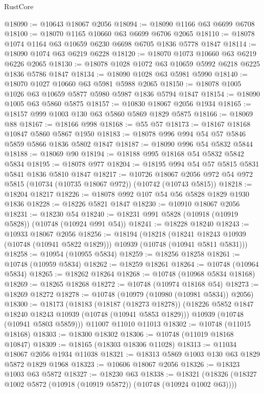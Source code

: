 \begin{lexlean}{RustCore}
\begin{coremodule}
@18090 := @10643 @18067 @2056
@18094 := @18090 @1166 @63 @6699 @6708
@18100 := @18070 @1165 @10660 @63 @6699 @6706 @2065
@18110 := @18078 @1074 @1164 @63 @10659 @6230 @6698 @6705 @1836 @5778 @1847
@18114 := @18090 @1074 @63 @6219 @6228
@18120 := @18070 @1073 @10660 @63 @6219 @6226 @2065
@18130 := @18078 @1028 @1072 @63 @10659 @5992 @6218 @6225 @1836 @5786 @1847
@18134 := @18090 @1028 @63 @5981 @5990
@18140 := @18070 @1027 @10660 @63 @5981 @5988 @2065
@18150 := @18078 @1005 @1026 @63 @10659 @5877 @5980 @5987 @1836 @5794 @1847
@18154 := @18090 @1005 @63 @5860 @5875
@18157 := @10830 @18067 @2056 @1934
@18165 := @18157 @999 @1003 @130 @63 @5860 @5869 @1829 @5875
@18166 := @18069 @88
@18167 := @18166 @998
@18168 := @55 @57
@18173 := @18167 @18168 @10847 @5860 @5867 @1950
@18183 := @18078 @996 @994 @54 @57 @5846 @5859 @5866 @1836 @5802 @1847
@18187 := @18090 @996 @54 @5832 @5844
@18188 := @18069 @90
@18194 := @18188 @995 @18168 @54 @5832 @5842 @5834
@18195 := @18078 @977
@18204 := @18195 @994 @54 @57 @5815 @5831 @5841 @1836 @5810 @1847
@18217 := @10726
    @18067
    @2056
    @972
    @54
    @972
    @5815
    (@10734 (@10735 @18067 @972))
    (@10742 (@10743 @5815))
@18218 := @18204 @18217
@18226 := @18078 @992 @107 @54 @56 @5828 @1829 @1930 @1836
@18228 := @18226 @5821 @1847
@18230 := @10910 @18067 @2056
@18231 := @18230 @54
@18240 := @18231 @991 @5828 (@10918 (@10919 @5828)) (@10748 (@10924 @991 @54))
@18241 := @18228 @18240
@18243 := @10933 @18067 @2056
@18256 := @18194
    (@18218
      (@18241 @18243 @10939 (@10748 (@10941 @5822 @1829)))
      @10939
      (@10748 (@10941 @5811 @5831)))
@18258 := @10954 (@10955 @5834)
@18259 := @18256 @18258
@18261 := @10748 (@10959 @5834)
@18262 := @18259 @18261
@18264 := @10748 (@10964 @5834)
@18265 := @18262 @18264
@18268 := @10748 (@10968 @5834 @18168)
@18269 := @18265 @18268
@18272 := @10748 (@10974 @18168 @54)
@18273 := @18269 @18272
@18278 := @10748 (@10979 (@10980 (@10981 @5834)) @2056)
@18300 := @18173
    (@18183
      (@18187 (@18273 @18278))
      (@18226 @5852 @1847 @18240 @18243 @10939 (@10748 (@10941 @5853 @1829)))
      @10939
      (@10748 (@10941 @5803 @5859)))
    @11007
    @11010
    @11013
@18302 := @10748 (@11015 @18168)
@18303 := @18300 @18302
@18306 := @10748 (@11019 @18168 @10847)
@18309 := @18165 (@18303 @18306 @11028)
@18313 := @11034 @18067 @2056 @1934 @11038
@18321 := @18313 @5869 @1003 @130 @63 @1829 @5872 @1829 @1968
@18323 := @10606 @18067 @2056
@18326 := @18323 @1003 @63 @5872
@18327 := @18230 @63
@18338 := @18321 (@18326 (@18327 @1002 @5872 (@10918 (@10919 @5872)) (@10748 (@10924 @1002 @63))))

\end{coremodule}
\end{lexlean}
